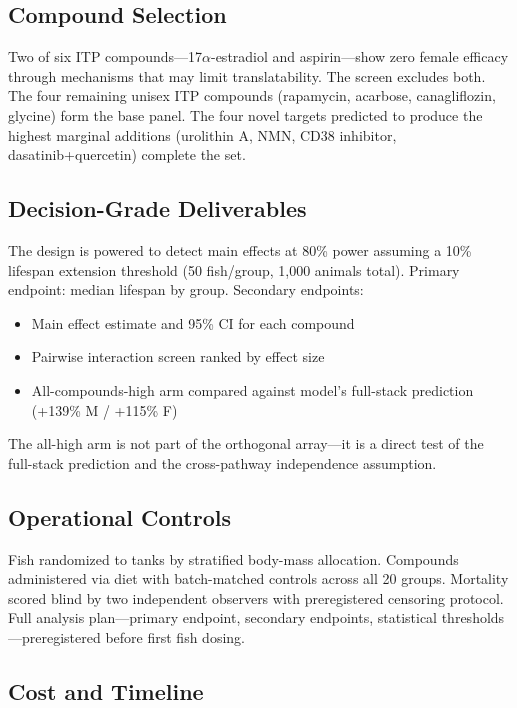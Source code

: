 \documentclass[11pt]{article}
\begin{document}
\subsection{Compound Selection}

Two of six ITP compounds---17$\alpha$-estradiol and aspirin---show zero female efficacy through mechanisms that may limit translatability. The screen excludes both. The four remaining unisex ITP compounds (rapamycin, acarbose, canagliflozin, glycine) form the base panel. The four novel targets predicted to produce the highest marginal additions (urolithin A, NMN, CD38 inhibitor, dasatinib+quercetin) complete the set.

\subsection{Decision-Grade Deliverables}

The design is powered to detect main effects at 80\% power assuming a 10\% lifespan extension threshold (50 fish/group, 1,000 animals total). Primary endpoint: median lifespan by group. Secondary endpoints:

\begin{itemize}
\item Main effect estimate and 95\% CI for each compound
\item Pairwise interaction screen ranked by effect size
\item All-compounds-high arm compared against model's full-stack prediction (+139\% M / +115\% F)
\end{itemize}

The all-high arm is not part of the orthogonal array---it is a direct test of the full-stack prediction and the cross-pathway independence assumption.

\subsection{Operational Controls}

Fish randomized to tanks by stratified body-mass allocation. Compounds administered via diet with batch-matched controls across all 20 groups. Mortality scored blind by two independent observers with preregistered censoring protocol. Full analysis plan---primary endpoint, secondary endpoints, statistical thresholds---preregistered before first fish dosing.

\subsection{Cost and Timeline}
\end{document}
